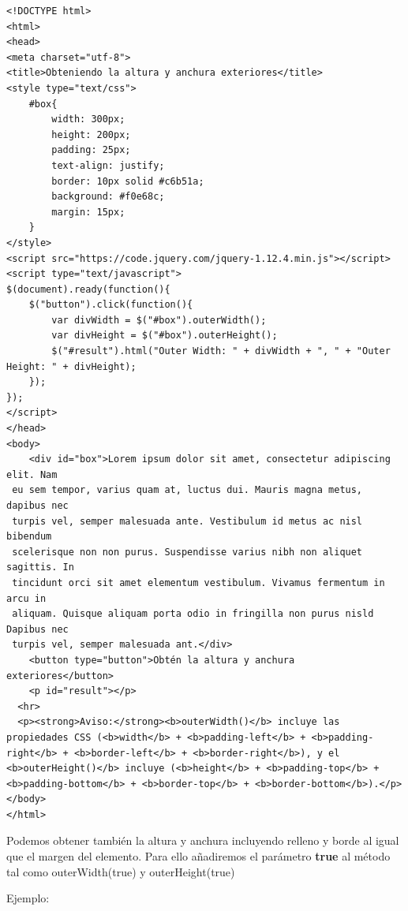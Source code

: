 \documentclass[a4paper, oneside]{article}
\begin{document}
\begin{verbatim}
<!DOCTYPE html>
<html>
<head>
<meta charset="utf-8">
<title>Obteniendo la altura y anchura exteriores</title>
<style type="text/css">
    #box{
        width: 300px;
        height: 200px;
        padding: 25px;
        text-align: justify;
        border: 10px solid #c6b51a;
        background: #f0e68c;
        margin: 15px;
    }        
</style>
<script src="https://code.jquery.com/jquery-1.12.4.min.js"></script>
<script type="text/javascript">
$(document).ready(function(){
    $("button").click(function(){
        var divWidth = $("#box").outerWidth();
        var divHeight = $("#box").outerHeight();
        $("#result").html("Outer Width: " + divWidth + ", " + "Outer Height: " + divHeight);
    });
});
</script>
</head>
<body>
    <div id="box">Lorem ipsum dolor sit amet, consectetur adipiscing elit. Nam
 eu sem tempor, varius quam at, luctus dui. Mauris magna metus, dapibus nec
 turpis vel, semper malesuada ante. Vestibulum id metus ac nisl bibendum
 scelerisque non non purus. Suspendisse varius nibh non aliquet sagittis. In
 tincidunt orci sit amet elementum vestibulum. Vivamus fermentum in arcu in
 aliquam. Quisque aliquam porta odio in fringilla non purus nisld Dapibus nec
 turpis vel, semper malesuada ant.</div>
    <button type="button">Obtén la altura y anchura exteriores</button>
    <p id="result"></p>
  <hr>
  <p><strong>Aviso:</strong><b>outerWidth()</b> incluye las propiedades CSS (<b>width</b> + <b>padding-left</b> + <b>padding-right</b> + <b>border-left</b> + <b>border-right</b>), y el <b>outerHeight()</b> incluye (<b>height</b> + <b>padding-top</b> + <b>padding-bottom</b> + <b>border-top</b> + <b>border-bottom</b>).</p>
</body>
</html>                                		
\end{verbatim}

Podemos obtener también la altura y anchura incluyendo relleno y borde al igual que el margen del elemento. Para ello añadiremos el parámetro \textbf{true} al método tal como outerWidth(true) y outerHeight(true)

Ejemplo:
\end{document}
